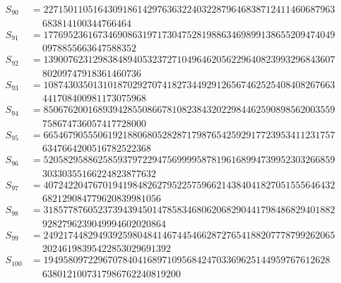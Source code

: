 \begin{align*}
S_{90} &= 22715011051643091861429763632240322879646838712411460687963 \\
    &\quad\ 683814100344766464\\
S_{91} &= 17769523616734690863197173047528198863469899138655209474049 \\
    &\quad\ 0978855663647588352\\
S_{92} &= 13900762312983848940532372710496462056229640823993296843607 \\
    &\quad\ 80209747918361460736\\
S_{93} &= 10874303501310187029270741827344929126567462525408408267663 \\
    &\quad\ 441708400981173075968\\
S_{94} &= 85067620016893942855086678108238432022984462590898562003559 \\
    &\quad\ 758674736057417728000\\
S_{95} &= 66546790555061921880680528287179876542592917723953411231757 \\
    &\quad\ 6347664200516782522368\\
S_{96} &= 52058295886258593797229475699995878196168994739952303266859 \\
    &\quad\ 30330355166224823877632\\
S_{97} &= 40724220476701941984826279522575966214384041827051555646432 \\
    &\quad\ 682129084779620839981056\\
S_{98} &= 31857787605237394394501478583468062068290441798486829401882 \\
    &\quad\ 9282796239049994602020864\\
S_{99} &= 24921744829493925980484146744546628727654188207778799262065 \\
    &\quad\ 20246198395422853029691392\\
S_{100} &= 1949580972296707840416897109568424703369625144959767612628 \\
    &\quad\ 6380121007317986762240819200\\
\end{align*}
